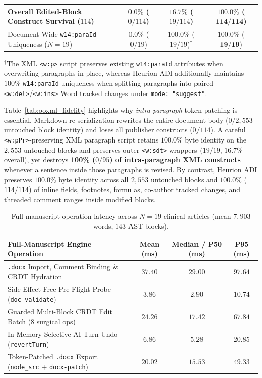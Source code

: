 \documentclass[11pt,a4paper]{article}
\begin{document}
\begin{table}[!t]
{\begin{tabular}{@{}lccc@{}}
\textbf{Overall Edited-Block Construct Survival ($114$)} & $0.0\%$ ($0/114$) & $16.7\%$ ($19/114$) & $\mathbf{100.0\%}$ ($\mathbf{114/114}$) \\
\midrule
Document-Wide \texttt{w14:paraId} Uniqueness ($N=19$) & $0.0\%$ ($0/19$) & $\mathbf{100.0\%}$ ($19/19$)$^\dagger$ & $\mathbf{100.0\%}$ ($\mathbf{19/19}$) \\
\bottomrule
\end{tabular}%
}
\vspace{2pt}
\raggedright\footnotesize $^\dagger$The XML \texttt{<w:p>} script preserves existing \texttt{w14:paraId} attributes when overwriting paragraphs in-place, whereas Heurion ADI additionally maintains $100\%$ \texttt{w14:paraId} uniqueness when splitting paragraphs into paired \texttt{<w:del>}/\texttt{<w:ins>} Word tracked changes under \texttt{mode: "suggest"}.
\end{table}

Table~\ref{tab:ooxml_fidelity} highlights why \emph{intra-paragraph} token patching is essential. Markdown re-serialization rewrites the entire document body ($0/2{,}553$ untouched block identity) and loses all publisher constructs ($0/114$). A careful \texttt{<w:pPr>}-preserving XML paragraph script retains $100.0\%$ byte identity on the $2{,}553$ untouched blocks and preserves outer \texttt{<w:sdt>} wrappers ($19/19$, $16.7\%$ overall), yet destroys \textbf{100\% ($0/95$) of intra-paragraph XML constructs} whenever a sentence inside those paragraphs is revised. By contrast, Heurion ADI preserves $100.0\%$ byte identity across all $2{,}553$ untouched blocks and $100.0\%$ ($114/114$) of inline fields, footnotes, formulas, co-author tracked changes, and threaded comment ranges inside modified blocks.

\begin{table}[!t]
\centering
\caption{Full-manuscript operation latency across $N=19$ clinical articles (mean $7{,}903$ words, $143$ AST blocks).}
\label{tab:latency_profile}
\vspace{2pt}
\small
\setlength{\tabcolsep}{0pt}
\begin{tabular*}{\textwidth}{@{\extracolsep{\fill}}lccc@{}}
\toprule
\textbf{Full-Manuscript Engine Operation} & \textbf{Mean (ms)} & \textbf{Median / P50 (ms)} & \textbf{P95 (ms)} \\
\midrule
\texttt{.docx} Import, Comment Binding \& CRDT Hydration & $37.40$ & $29.00$ & $97.64$ \\
Side-Effect-Free Pre-Flight Probe (\texttt{doc\_validate}) & $\mathbf{3.86}$ & $\mathbf{2.90}$ & $\mathbf{10.74}$ \\
Guarded Multi-Block CRDT Edit Batch ($8$ surgical ops) & $24.26$ & $17.42$ & $67.84$ \\
In-Memory Selective AI Turn Undo (\texttt{revertTurn}) & $\mathbf{6.86}$ & $\mathbf{5.28}$ & $\mathbf{20.85}$ \\
Token-Patched \texttt{.docx} Export (\texttt{node\_src} + \texttt{docx-patch}) & $20.02$ & $15.53$ & $49.33$ \\
\bottomrule
\end{tabular*}
\end{table}
\end{document}
